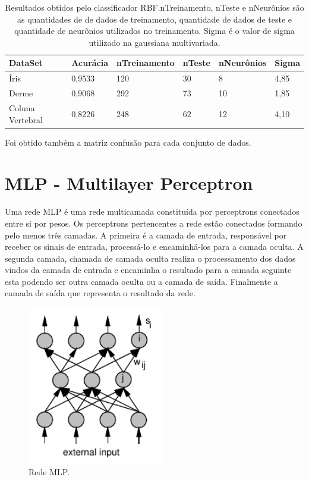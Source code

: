 \documentclass[
	article,			%
	11pt,				%
	oneside,			%
	a4paper,			%
	english,			%
	brazil,				%
	sumario=tradicional
	]{abntex2}
\begin{document}
\begin{table}[h]
\begin{tabular}{|l|l|l|l|l|l|}
\hline
DataSet          & Acurácia & nTreinamento & nTeste & nNeurônios & Sigma \\ \hline
Íris             & 0,9533   & 120          & 30     & 8          & 4,85  \\ \hline
Derme            & 0,9068   & 292          & 73     & 10         & 1,85  \\ \hline
Coluna Vertebral & 0,8226   & 248          & 62     & 12         & 4,10   \\
\hline
\end{tabular}
\caption{Resultados obtidos pelo classificador RBF.nTreinamento, nTeste e
nNeurônios são as quantidades de de dados de treinamento, quantidade de dados
de teste e quantidade de neurônios utilizados no treinamento. Sigma é o valor
de sigma utilizado na gaussiana multivariada.}
\label{tab:rbfRes}
\end{table}

Foi obtido também a matriz confusão para cada conjunto de dados.

\newpage

\section*{MLP - Multilayer Perceptron}

Uma rede MLP é uma rede multicamada constituída por perceptrons conectados
entre si por pesos. Os perceptrons pertencentes a rede estão conectados formando
pelo menos três camadas. A primeira é a camada de entrada, responsável por
receber os sinais de entrada, processá-lo e encaminhá-los para a camada oculta.
A segunda camada, chamada de camada oculta realiza o processamento dos dados
vindos da camada de entrada e encaminha o resultado para a camada seguinte esta
podendo ser outra camada oculta ou a camada de saída. Finalmente a camada de
saída que representa o resultado da rede. 

\begin{figure}[!htb]
	\centering
	\includegraphics[width=6cm]{imagens/mlp.png}
	\caption{Rede MLP.}
	\label{fig:digraph}
\end{figure}
\end{document}
